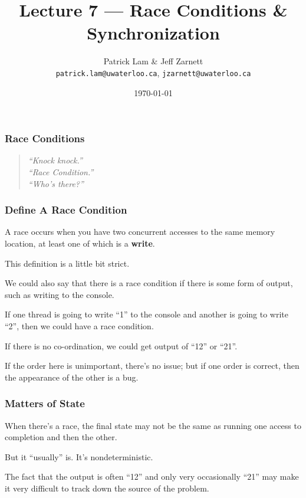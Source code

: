 
\usepackage{multirow}

\title{Lecture 7 --- Race Conditions \& Synchronization }

\author{Patrick Lam \& Jeff Zarnett \\ \small \texttt{patrick.lam@uwaterloo.ca}, \texttt{jzarnett@uwaterloo.ca}}
\date{\today}




\begin{frame}
  \titlepage

 \end{frame}



\begin{frame}
\frametitle{Race Conditions }

\vfill
\begin{quote}
\textit{
	``Knock knock.''\\
	``Race Condition.''\\
	``Who's there?''
	}
\end{quote}
\end{frame}



\begin{frame}
\frametitle{Define A Race Condition}

A race occurs when you have two concurrent accesses to the
same memory location, at least one of which is a {\bf write}.

This definition is a little bit strict. 

We could also say that there is a race condition if there is some form of output, such as writing to the console. 

If one thread is going to write ``1'' to the console and another is going to write ``2'', then we could have a race condition. 

If there is no co-ordination, we could get output of ``12'' or ``21''. 

If the order here is unimportant, there's no issue; but if one order is correct, then the appearance of the other is a bug.

\end{frame}



\begin{frame}
\frametitle{Matters of State}

When there's a race, the final state may not be the same as running
one access to completion and then the other. 

But it ``usually'' is.  It's nondeterministic. 

The fact that the output is often ``12'' and only very occasionally ``21'' may make it very difficult to track down the source of the problem. 

\end{frame}



